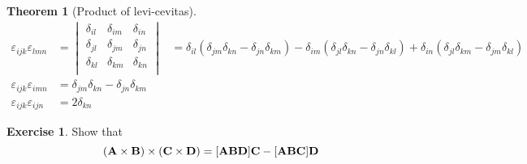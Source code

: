 \documentclass[10pt, a4paper]{extarticle}
\theoremstyle{definition}
\newtheorem{thm}{Theorem}
\newtheorem{ex}{Exercise}
\numberwithin{equation}{subsection}
\begin{document}
\begin{thm}[Product of levi-cevitas]
	\begin{align}
		\varepsilon_{ijk}\varepsilon_{lmn} & = \begin{vmatrix}
			\delta_{il} & \delta_{im} & \delta_{in} \\
			\delta_{jl} & \delta_{jm} & \delta_{jn} \\
			\delta_{kl} & \delta_{km} & \delta_{kn} \\
		\end{vmatrix}
		                                   & = \delta_{il}\left( \delta_{jm}\delta_{kn} - \delta_{jn}\delta_{km}\right) - \delta_{im}\left( \delta_{jl}\delta_{kn} - \delta_{jn}\delta_{kl} \right) + \delta_{in} \left( \delta_{jl}\delta_{km} - \delta_{jm}\delta_{kl} \right) \\
		\varepsilon_{ijk}\varepsilon_{imn} & = \delta_{jm}\delta_{kn} - \delta_{jn}\delta_{km}\label{levi cevita}                                                                                                                                                                \\
		\varepsilon_{ijk}\varepsilon_{ijn} & = 2\delta_{kn}
	\end{align}
\end{thm}

\begin{ex}
	Show that
	\begin{equation}(\vb{A}\times\vb{B})\times(\vb{C}\times\vb{D})=[\vb{ABD}]\vb{C}-[\vb{ABC}]\vb{D}\end{equation}
\end{ex}
\end{document}
